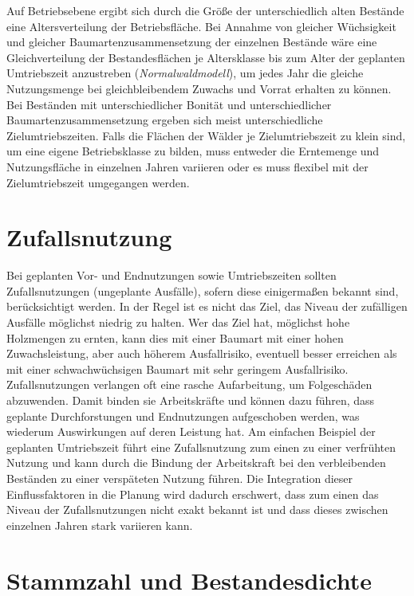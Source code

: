 \documentclass[twocolumn, paper=a4, fontsize=10pt]{scrartcl}
\begin{document}
Auf Betriebsebene ergibt sich durch die Größe der unterschiedlich alten Bestände
eine Altersverteilung der Betriebsfläche. Bei Annahme von gleicher Wüchsigkeit
und gleicher Baumartenzusammensetzung der einzelnen Bestände wäre eine
Gleichverteilung der Bestandesflächen je Altersklasse bis zum Alter der
geplanten Umtriebszeit anzustreben (\emph{Normalwaldmodell}), um jedes Jahr die gleiche
Nutzungsmenge bei gleichbleibendem Zuwachs und Vorrat erhalten zu können. Bei
Beständen mit unterschiedlicher Bonität und unterschiedlicher
Baumartenzusammensetzung ergeben sich meist unterschiedliche Zielumtriebszeiten.
Falls die Flächen der Wälder je Zielumtriebszeit zu klein sind, um eine eigene
Betriebsklasse zu bilden, muss entweder die Erntemenge und Nutzungsfläche in
einzelnen Jahren variieren oder es muss flexibel mit der Zielumtriebszeit
umgegangen werden.

\section{Zufallsnutzung}

Bei geplanten Vor- und Endnutzungen sowie Umtriebszeiten sollten
Zufallsnutzungen (ungeplante Ausfälle), sofern diese einigermaßen bekannt sind,
berücksichtigt werden. In der Regel ist es nicht das Ziel, das Niveau der
zufälligen Ausfälle möglichst niedrig zu halten. Wer das Ziel hat, möglichst hohe
Holzmengen zu ernten, kann dies mit einer Baumart mit einer hohen
Zuwachsleistung, aber auch höherem Ausfallrisiko, eventuell besser erreichen als
mit einer schwachwüchsigen Baumart mit sehr geringem Ausfallrisiko.
Zufallsnutzungen verlangen oft eine rasche Aufarbeitung, um Folgeschäden
abzuwenden. Damit binden sie Arbeitskräfte und können dazu führen, dass geplante
Durchforstungen und Endnutzungen aufgeschoben werden, was wiederum Auswirkungen
auf deren Leistung hat. Am einfachen Beispiel der geplanten Umtriebszeit führt
eine Zufallsnutzung zum einen zu einer verfrühten Nutzung und kann durch die
Bindung der Arbeitskraft bei den verbleibenden Beständen zu einer verspäteten
Nutzung führen. Die Integration dieser Einflussfaktoren in die Planung wird
dadurch erschwert, dass zum einen das Niveau der Zufallsnutzungen nicht exakt
bekannt ist und dass dieses zwischen einzelnen Jahren stark variieren kann.

\section{Stammzahl und Bestandesdichte}
\label{sec:StammzahlUndBestandesdichte}
\end{document}
